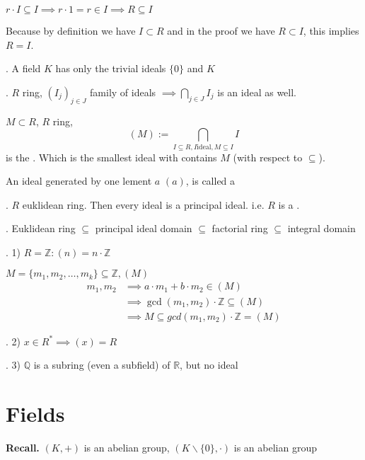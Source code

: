 $r \cdot I \subseteq I \implies r \cdot 1 = r \in I \implies R \subseteq I$

Because by definition we have $I \subset R$ and in the proof we have $R \subset I$, this implies $R = I$.

\Corollary.
A field $K$ has only the trivial ideals $\{0\}$ and $K$

\Remark. 
$R$ ring, $(I_j)_{j\in J}$ family of ideals $\implies \bigcap_{j \in J} I_j$ is an ideal as well.

\begin{definition}
  $M \subset R$, $R$ ring, 
  \[
    (M):= \bigcap_{I \subseteq R, I \text{ideal}, M \subseteq I} I
  \]
  is the . Which is the smallest ideal with contains $M$ (with respect to $\subseteq$).
\end{definition}

\begin{definition}
  An ideal generated by one lement $a$ $(a)$, is called a 
\end{definition}

\Theorem.
$R$ euklidean ring. Then every ideal is a principal ideal. 
i.e. $R$ is a .

\Remark. 
Euklidean ring $\subseteq$ principal ideal domain $\subseteq$ factorial ring $\subseteq$ integral domain

\Example.
1) $R=\mathbb{Z}: (n) = n\cdot \mathbb{Z}$

$M = \{m_1, m_2, \ldots, m_k\} \subseteq \mathbb{Z}, (M)$\\
\begin{align*}
  m_1, m_2 &\implies a \cdot m_1 + b\cdot m_2 \in (M) \\
           &\implies \gcd(m_1,m_2) \cdot \mathbb{Z} \subseteq (M) \\
           &\implies M \subseteq gcd(m_1,m_2) \cdot \mathbb{Z} = (M)
\end{align*}

\Example.
2) $x\in R^{*} \implies (x) = R$

\Example.
3) $\mathbb{Q}$ is a subring (even a subfield) of $\mathbb{R}$, but no ideal 

\section{Fields}

\textbf{Recall.}
$(K,+)$ is an abelian group, $(K\backslash \{0\}, \cdot)$ is an abelian group

